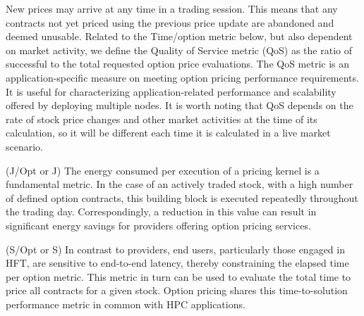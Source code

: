 \begin{description}[leftmargin=0cm]
  \item[QoS] New prices may arrive at any time in a trading 
             session. This means that any contracts not yet 
             priced using the previous price update are 
             abandoned and deemed unusable. Related to the 
             Time/option metric below, 
             but also dependent on market activity, we define 
             the Quality of Service metric (QoS) as the ratio 
             of successful to the total requested option 
             price evaluations. The QoS metric is an 
             application-specific measure on meeting 
             option pricing performance requirements. It is 
             useful for characterizing application-related 
             performance and scalability offered by deploying 
             multiple nodes. It is worth noting that QoS 
             depends on the rate of stock price changes and other 
             market activities at the time of its calculation,
             so it will be different each time it is calculated 
             in a live market scenario.
  \item[Joules/option] (J/Opt or J) The energy consumed per execution of a pricing kernel is
         a fundamental metric.
In the case of 
         an actively traded stock, with a high 
         number of defined option contracts, this building
         block is executed repeatedly throughout the trading day.
         Correspondingly, a reduction in this value can result in significant
         energy savings for providers offering option pricing services.
 \item[Time/option] (S/Opt or S)
         In contrast to providers, end users, particularly those engaged in HFT, 
         are sensitive to end-to-end latency, thereby constraining the elapsed 
         time per option metric. This metric in turn can be used to evaluate the 
         total time to price all contracts for a given stock. Option pricing 
         shares this time-to-solution performance metric in common with HPC applications. 
\end{description}
